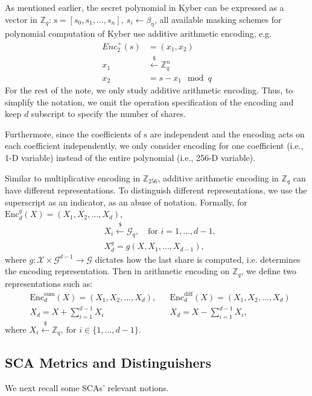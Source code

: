 \documentclass{llncs}
\begin{document}
	As mentioned earlier, the secret polynomial in Kyber can be expressed as a vector in $\mathbb{Z}_q$:
	$\text{s} = [s_0, s_1, \dots, s_n],\ s_i \leftarrow \beta_{\eta}$, all available masking schemes for polynomial computation of Kyber  use additive arithmetic encoding, e.g.
	\begin{align*}
		Enc_2^{+}(s) &= (x_1, x_2)\\
		x_1 &\overset{\$}{\leftarrow} \mathbb{Z}_q^n\\
		x_2 &= s-x_1 \mod q
	\end{align*}
	For the rest of the note, we only study additive arithmetic encoding. Thus, to simplify the notation, we omit the operation specification of the encoding and keep $d$ subscript to specify the number of shares. 
	
	Furthermore, since the coefficients of $\text{s}$ are independent and the encoding acts on each coefficient independently, we only consider encoding for one coefficient (i.e., 1-D variable) instead of the entire polynomial (i.e., 256-D variable).
	
	Similar to multiplicative encoding in $\mathbb{Z}_{256}$, additive arithmetic encoding in $\mathbb{Z}_q$ can have different representations. To distinguish different representations, we use the superscript as an indicator, as an abuse of notation. Formally, for $\text{Enc}^{g}_{d}(X) = (X_1, X_2, \dots, X_d)$, 
	\begin{align*}
		&X_i \overset{\$}{\leftarrow}\mathcal{G}_q,\quad \text{for } i = 1,\dots, d-1, \\
		&X_d^g = g(X, X_1, \dots, X_{d-1}),
	\end{align*}
	where $g: \mathcal{X} \times \mathcal{G}^{d-1} \rightarrow \mathcal{G}$ dictates how the last share is computed, i.e. determines the encoding representation.
	Then in arithmetic encoding on $\mathbb{Z}_q$, we define two representations such as:
	\begin{align*}
		&\text{Enc}^{\text{sum}}_{d}(X) = (X_1, X_2, \dots, X_d)   ,  &  &\text{Enc}^{\text{diff}}_{d}(X) = (X_1, X_2, \dots, X_d) \\
		&X_d = X + \sum_{i =1}^{d-1}X_i   &  &X_d = X - \sum_{i =1}^{d-1}X_i ,
	\end{align*}
	where $X_i \overset{\$}{\leftarrow} \mathbb{Z}_q,\ \text{for } i \in \{1, \dots, d-1\}$.
	
	\subsection*{SCA Metrics and Distinguishers}
	We next recall some SCAs' relevant notions.
\end{document}
